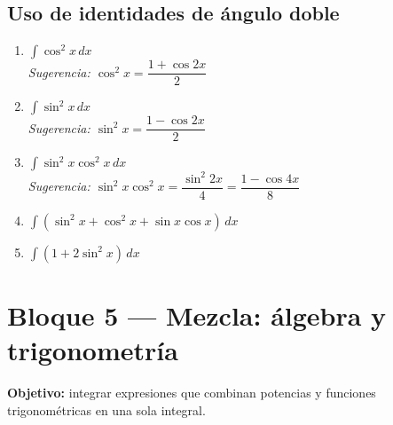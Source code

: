 \documentclass[12pt, letterpaper]{article}
\newcommand{\dx}{\,dx}
\begin{document}
\subsection{Uso de identidades de ángulo doble}

\begin{enumerate}[label=\textbf{\arabic*.}, leftmargin=*, itemsep=14pt, start=54]

  \item \medio\quad
    $\displaystyle\int \cos^2 x \dx$\\
    \textit{Sugerencia: $\cos^2 x = \dfrac{1+\cos 2x}{2}$}

  \item \medio\quad
    $\displaystyle\int \sin^2 x \dx$\\
    \textit{Sugerencia: $\sin^2 x = \dfrac{1-\cos 2x}{2}$}

  \item \dificil\quad
    $\displaystyle\int \sin^2 x\cos^2 x \dx$\\
    \textit{Sugerencia: $\sin^2 x\cos^2 x = \dfrac{\sin^2 2x}{4} = \dfrac{1-\cos 4x}{8}$}

  \item \dificil\quad
    $\displaystyle\int \left(\sin^2 x + \cos^2 x + \sin x\cos x\right)\dx$

  \item \dificil\quad
    $\displaystyle\int \left(1 + 2\sin^2 x\right)\dx$

\end{enumerate}

\vspace{4pt}

\section{Bloque 5 — Mezcla: álgebra y trigonometría}

\begin{cuadroinfo}
\small\textbf{Objetivo:} integrar expresiones que combinan potencias y funciones
trigonométricas en una sola integral.
\end{cuadroinfo}

\vspace{4pt}
\end{document}
